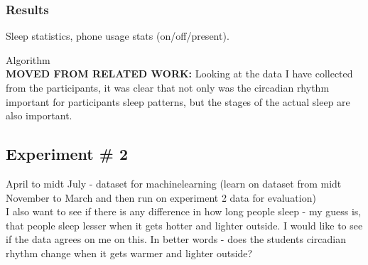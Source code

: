 \documentclass[12pt]{article} %
\begin{document}
\subsubsection{Results}
Sleep statistics, phone usage stats (on/off/present). 


Algorithm\\

\textbf{MOVED FROM RELATED WORK:}
Looking at the data I have collected from the participants, it was clear that not only was the circadian rhythm important for participants sleep patterns, but the stages of the actual sleep are also important. 





\subsection{Experiment \# 2}
April to midt July - dataset for machinelearning (learn on dataset from midt November to March and then run on experiment 2 data for evaluation)\\

I also want to see if there is any difference in how long people sleep - my guess is, that people sleep lesser when it gets hotter and lighter outside. I would like to see if the data agrees on me on this. In better words - does the students circadian rhythm change when it gets warmer and lighter outside?


\end{document}
